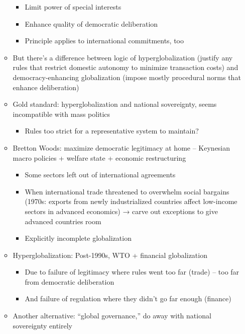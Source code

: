 \begin{itemize}
\begin{itemize}
    \begin{itemize}
    \tightlist
    \item
      Limit power of special interests
    \item
      Enhance quality of democratic deliberation
    \item
      Principle applies to international commitments, too
    \end{itemize}
  \item
    But there's a difference between logic of hyperglobalization
    (justify any rules that restrict domestic autonomy to minimize
    transaction costs) and democracy-enhancing globalization (impose
    mostly procedural norms that enhance deliberation)
  \item
    Gold standard: hyperglobalization and national sovereignty, seems
    incompatible with mass politics

    \begin{itemize}
    \tightlist
    \item
      Rules too strict for a representative system to maintain?
    \end{itemize}
  \item
    Bretton Woods: maximize democratic legitimacy at home -- Keynesian
    macro policies + welfare state + economic restructuring

    \begin{itemize}
    \tightlist
    \item
      Some sectors left out of international agreements
    \item
      When international trade threatened to overwhelm social bargains
      (1970s: exports from newly industrialized countries affect
      low-income sectors in advanced economics) → carve out exceptions
      to give advanced countries room
    \item
      Explicitly incomplete globalization
    \end{itemize}
  \item
    Hyperglobalization: Post-1990s, WTO + financial globalization

    \begin{itemize}
    \tightlist
    \item
      Due to failure of legitimacy where rules went too far (trade) --
      too far from democratic deliberation
    \item
      And failure of regulation where they didn't go far enough
      (finance)
    \end{itemize}
  \item
    Another alternative: ``global governance,'' do away with national
    sovereignty entirely


\end{itemize}
\end{itemize}
